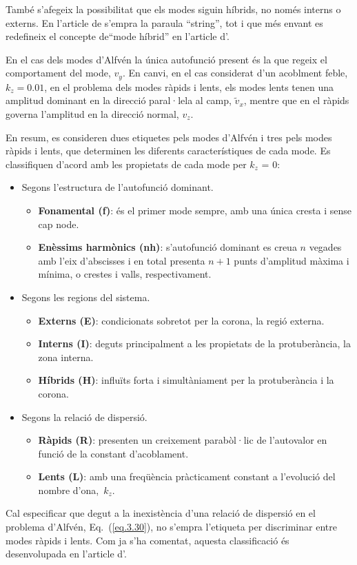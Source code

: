 També s'afegeix la possibilitat que els modes siguin híbrids, no només interns o externs.
En l'article de \textcite{oscillation_modes_II} s'empra la paraula ``string'', tot i que més envant es redefineix el concepte de``mode híbrid'' en l'article d'\textcite{oscillations_quiescent_solar_prominence}.

En el cas dels modes d'Alfvén la única autofunció present és la que regeix el comportament del mode, $v_y$.
En canvi, en el cas considerat d'un acoblment feble, $k_z = 0.01$, en el problema dels modes ràpids i lents,
els modes lents tenen una amplitud dominant en la direcció paral·lela al camp, $\tilde{v}_{x}$,
mentre que en el ràpids governa l'amplitud en la direcció normal, $v_z$.

En resum, es consideren dues etiquetes pels modes d'Alfvén i tres pels modes ràpids i lents,
que determinen les diferents característiques de cada mode.
Es classifiquen d'acord amb les propietats de cada mode per $k_z$ = 0:
\begin{itemize}
	\item Segons l'estructura de l'autofunció dominant.
	\begin{itemize}
		\item \textbf{Fonamental (f)}: és el primer mode sempre, amb una única cresta i sense cap node.
		\item \textbf{Enèssims harmònics (nh)}: s'autofunció dominant es creua $n$ vegades amb l'eix d'abscisses i en total presenta $n + 1$ punts d'amplitud màxima i mínima, o crestes i valls, respectivament.
	\end{itemize}
	
	\item Segons les regions del sistema.
	\begin{itemize}
		\item \textbf{Externs (E)}: condicionats sobretot per la corona, la regió externa.
		\item \textbf{Interns (I)}: deguts principalment a les propietats de la protuberància, la zona interna.
		\item \textbf{Híbrids (H)}: influïts forta i simultàniament per la protuberància i la corona.
	\end{itemize}
	
	\item Segons la relació de dispersió.
	\begin{itemize}
		\item \textbf{Ràpids (R)}: presenten un creixement parabòl·lic de l'autovalor en funció de la constant d'acoblament.
		\item \textbf{Lents (L)}: amb una freqüència pràcticament constant a l'evolució del nombre d'ona,~$k_z$.
	\end{itemize}
\end{itemize}
Cal especificar que degut a la inexistència d'una relació de dispersió en el problema d'Alfvén, Eq.~(\ref{eq.3.30}),
no s'empra l'etiqueta per discriminar entre modes ràpids i lents.
Com ja s'ha comentat, aquesta classificació és desenvolupada en l'article d'\textcite{oscillations_quiescent_solar_prominence}.





